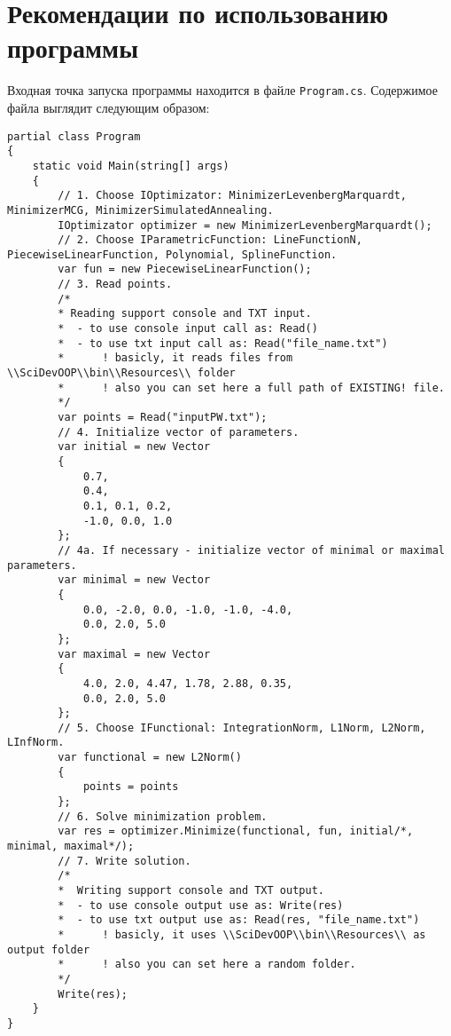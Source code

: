 \chapter{Рекомендации по использованию программы}

Входная точка запуска программы находится в файле \texttt{Program.cs}. Содержимое файла выглядит следующим образом:

\begin{verbatim}
partial class Program
{
	static void Main(string[] args)
	{
		// 1. Choose IOptimizator: MinimizerLevenbergMarquardt, MinimizerMCG, MinimizerSimulatedAnnealing.
		IOptimizator optimizer = new MinimizerLevenbergMarquardt();
		// 2. Choose IParametricFunction: LineFunctionN, PiecewiseLinearFunction, Polynomial, SplineFunction.
		var fun = new PiecewiseLinearFunction();
		// 3. Read points.
		/*
		* Reading support console and TXT input.
		*  - to use console input call as: Read()
		*  - to use txt input call as: Read("file_name.txt")
		*      ! basicly, it reads files from \\SciDevOOP\\bin\\Resources\\ folder
		*      ! also you can set here a full path of EXISTING! file.
		*/
		var points = Read("inputPW.txt");
		// 4. Initialize vector of parameters.
		var initial = new Vector
		{
			0.7,
			0.4,
			0.1, 0.1, 0.2,
			-1.0, 0.0, 1.0
		};
		// 4a. If necessary - initialize vector of minimal or maximal parameters.
		var minimal = new Vector
		{
			0.0, -2.0, 0.0, -1.0, -1.0, -4.0,
			0.0, 2.0, 5.0
		};
		var maximal = new Vector
		{
			4.0, 2.0, 4.47, 1.78, 2.88, 0.35,
			0.0, 2.0, 5.0
		};
		// 5. Choose IFunctional: IntegrationNorm, L1Norm, L2Norm, LInfNorm.
		var functional = new L2Norm()
		{
			points = points
		};
		// 6. Solve minimization problem.
		var res = optimizer.Minimize(functional, fun, initial/*, minimal, maximal*/);
		// 7. Write solution.
		/*
		*  Writing support console and TXT output.
		*  - to use console output use as: Write(res)
		*  - to use txt output use as: Read(res, "file_name.txt")
		*      ! basicly, it uses \\SciDevOOP\\bin\\Resources\\ as output folder
		*      ! also you can set here a random folder.
		*/
		Write(res);
	}
}
\end{verbatim}

